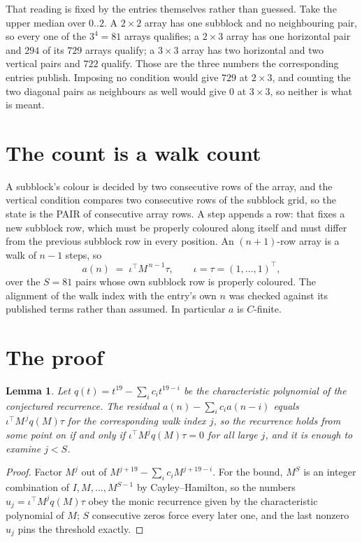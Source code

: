 \documentclass[11pt,a4paper]{article}
\theoremstyle{plain}
\newtheorem{lemma}[theorem]{Lemma}
\theoremstyle{definition}
\begin{document}
That reading is fixed by the entries themselves rather than guessed. Take the upper median
over $0..2$. A $2\times2$ array has one subblock and no neighbouring pair, so every one of the
$3^4=81$ arrays qualifies; a $2\times3$ array has one horizontal pair and $294$ of its $729$
arrays qualify; a $3\times3$ array has two horizontal and two vertical pairs and $722$
qualify. Those are the three numbers the corresponding entries publish. Imposing no condition
would give $729$ at $2\times3$, and counting the two diagonal pairs as neighbours as well
would give $0$ at $3\times3$, so neither is what is meant.

\section{The count is a walk count}

A subblock's colour is decided by two consecutive rows of the array, and
the vertical condition compares two consecutive rows of the subblock grid, so the state is the
PAIR of consecutive array rows. A step appends a row: that fixes a new subblock row, which
must be properly coloured along itself and must differ from the previous subblock row in every
position. An $(n+1)$-row array is a walk of $n-1$ steps, so
\[
a(n)\;=\;\iota^{\!\top}M^{\,n-1}\tau,\qquad\iota=\tau=(1,\dots,1)^{\!\top},
\]
over the $S=81$ pairs whose own subblock row is properly coloured.
The alignment of the walk index with the entry's own $n$ was checked against its published
terms rather than assumed. In particular $a$ is $C$-finite.

\section{The proof}

\begin{lemma}\label{lem:crit}
Let $q(t)=t^{19}-\sum_i c_it^{19-i}$ be the characteristic polynomial of the
conjectured recurrence. The residual $a(n)-\sum_ic_ia(n-i)$ equals
$\iota^{\!\top}M^{\,j}q(M)\tau$ for the corresponding walk index $j$, so the recurrence
holds from some point on if and only if $\iota^{\!\top}M^{j}q(M)\tau=0$ for all large $j$,
and it is enough to examine $j<S$.
\end{lemma}

\begin{proof}
Factor $M^{j}$ out of $M^{j+19}-\sum_ic_iM^{j+19-i}$. For the bound, $M^{S}$
is an integer combination of $I,M,\dots,M^{S-1}$ by Cayley--Hamilton, so the numbers
$u_j=\iota^{\!\top}M^{j}q(M)\tau$ obey the monic recurrence given by the characteristic
polynomial of $M$; $S$ consecutive zeros force every later one, and the last nonzero $u_j$
pins the threshold exactly.
\end{proof}
\end{document}
